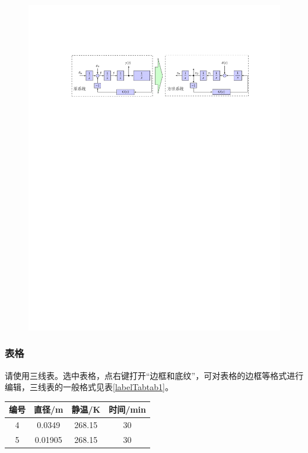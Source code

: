 \documentclass[10.5pt,twocolumn]{aaas}
\begin{document}
\begin{figure}[t!]
\centering
\includegraphics [scale=1,trim=0 0 0 0]{./image/FigBigAcross}
\end{figure}

\subsubsection{表格}
请使用三线表。选中表格，点右键打开``边框和底纹”，可对表格的边框等格式进行编辑，三线表的一般格式见表\ref{labelTabtab1}。
\begin{table}[h]
\centering
\captionnamefont{\xiaowuhao\bf }
\captiontitlefont{\xiaowuhao\bf }
\renewcommand\tabcolsep{1em}
\begin{tabular}{cccc}
\toprule
{编号} &  {直径}/\si{\metre} & {静温}/\si{\kelvin} & {时间}/min\\
\midrule 
4 & 0.0349 & 268.15 & 30\\
5 & 0.01905 & 268.15 & 30\\
\bottomrule
\end{tabular}
\end{table}
\end{document}
